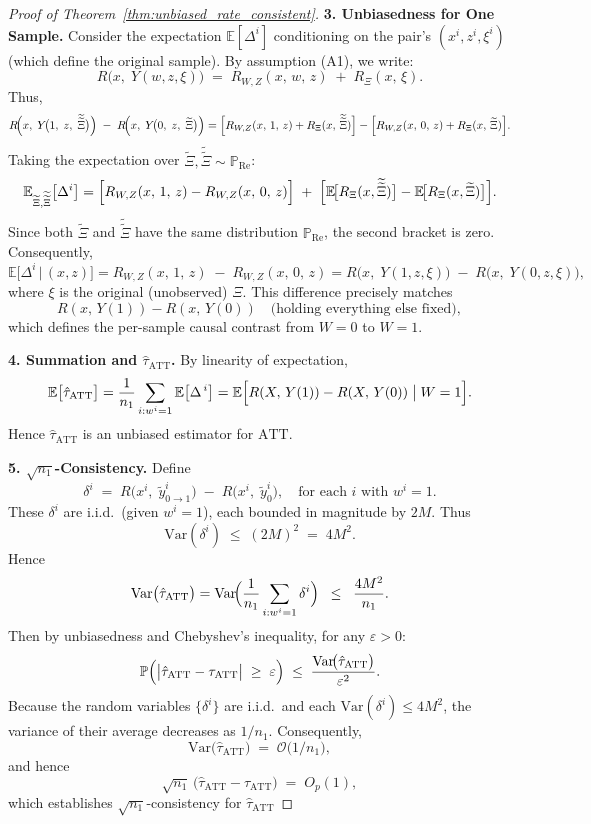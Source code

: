 \begin{proof}[Proof of Theorem~\ref{thm:unbiased_rate_consistent}]
\bigskip
\textbf{3. Unbiasedness for One Sample.}
Consider the expectation \(\mathbb{E}[\Delta^i]\) conditioning on the pair’s \((x^i,z^i,\xi^i)\) (which define the original sample). By assumption (A1), we write:
\[
R\!\bigl(x,\;Y(w,z,\xi)\bigr)
\;=\;
R_{W,Z}(x,\,w,\,z)
\;+\;
R_{\Xi}(x,\,\xi).
\]
Thus,
\[
R\!\Bigl(x,\;Y\!\bigl(1,\;z,\;\widetilde{\widetilde{\Xi}}\bigr)\Bigr)
\;-\;
R\!\Bigl(x,\;Y\!\bigl(0,\;z,\;\widetilde{\Xi}\bigr)\Bigr)
=
\Bigl[R_{W,Z}(x,\,1,\,z) + R_{\Xi}(x,\,\widetilde{\widetilde{\Xi}})\Bigr]
-
\Bigl[R_{W,Z}(x,\,0,\,z) + R_{\Xi}(x,\,\widetilde{\Xi})\Bigr].
\]
Taking the expectation over \(\widetilde{\Xi}, \widetilde{\widetilde{\Xi}}\sim \mathbb{P}_{\mathrm{Re}}\):
\[
\mathbb{E}_{\widetilde{\Xi},\widetilde{\widetilde{\Xi}}}\bigl[\Delta^i\bigr]
=
\Bigl[
R_{W,Z}(x,\,1,\,z) - R_{W,Z}(x,\,0,\,z)
\Bigr]
\;+\;
\Bigl[
\mathbb{E}\!\bigl[R_{\Xi}(x,\widetilde{\widetilde{\Xi}})\bigr]
-
\mathbb{E}\!\bigl[R_{\Xi}(x,\widetilde{\Xi})\bigr]
\Bigr].
\]
Since both \(\widetilde{\Xi}\) and \(\widetilde{\widetilde{\Xi}}\) have the same distribution \(\mathbb{P}_{\mathrm{Re}}\), the second bracket is zero. Consequently,
\[
\mathbb{E}\bigl[\Delta^i \,\big|\,(x,z)\bigr]
=
R_{W,Z}(x,\,1,\,z) \;-\; R_{W,Z}(x,\,0,\,z)
=
R\!\bigl(x,\;Y(1,z,\xi)\bigr) \;-\; R\!\bigl(x,\;Y(0,z,\xi)\bigr),
\]
where \(\xi\) is the original (unobserved) \(\Xi\). This difference precisely matches
\[
R(x,\,Y(1)) - R(x,\,Y(0))
\quad
\text{(holding everything else fixed)},
\]
which defines the per-sample causal contrast from \(W=0\) to \(W=1\).

\bigskip
\textbf{4. Summation and \(\hat{\tau}_{\text{ATT}}\).}
By linearity of expectation,
\[
\mathbb{E}\bigl[\hat{\tau}_{\text{ATT}}\bigr]
=
\frac{1}{n_1}\sum_{i: w^i=1}
\mathbb{E}\bigl[\Delta^{\,i}\bigr]
=
\mathbb{E}\Bigl[
R(X,\,Y(1)) - R(X,\,Y(0)) \;\big|\; W=1
\Bigr].
\]
Hence \(\hat{\tau}_{\text{ATT}}\) is an unbiased estimator for \(\text{ATT}\).

\bigskip
\textbf{5. $\sqrt{n_1}$-Consistency.}
Define
\[
\delta^i \;=\; R\bigl(x^i,\;\tilde{y}^{i}_{0\to1}\bigr) \;-\; R\bigl(x^i,\;\tilde{y}^{i}_{0}\bigr), \quad \text{for each }i\text{ with }w^i=1.
\]
These $\delta^i$ are i.i.d.\ (given $w^i=1$), each bounded in magnitude by $2M$. Thus
\[
\mathrm{Var}(\delta^i) \;\le\; (2M)^2 \;=\; 4M^2.
\]
Hence
\[
\mathrm{Var}\bigl(\hat{\tau}_{\text{ATT}}\bigr) = \mathrm{Var}\!\Bigl(\frac{1}{n_1}\sum_{i: w^i=1}\delta^i\Bigr) \;\;\le\;\; \frac{4M^2}{n_1}.
\]
Then by unbiasedness and Chebyshev's inequality, for any $\varepsilon>0$:
\[
\mathbb{P}\Bigl(\bigl|\hat{\tau}_{\text{ATT}} - \tau_{\text{ATT}}\bigr|\;\ge\;\varepsilon\Bigr) \;\le\; \frac{\mathrm{Var}\!\bigl(\hat{\tau}_{\text{ATT}}\bigr)}{\varepsilon^2}.
\]
Because the random variables $\{\delta^{i}\}$ are i.i.d.\ and each $\mathrm{Var}(\delta^{i})\le4M^2$, the variance of their average decreases as $1/n_1$. Consequently,
\[
\mathrm{Var}\bigl(\hat{\tau}_{\text{ATT}}\bigr)\;=\;\mathcal{O}\!\bigl(1/n_1\bigr),
\]
and hence
\[
\sqrt{n_1}\,\bigl(\hat{\tau}_{\text{ATT}} - \tau_{\text{ATT}}\bigr) \;=\; O_{p}(1),
\]
which establishes $\sqrt{n_1}$-consistency for $\hat{\tau}_{\text{ATT}}$


\end{proof}
